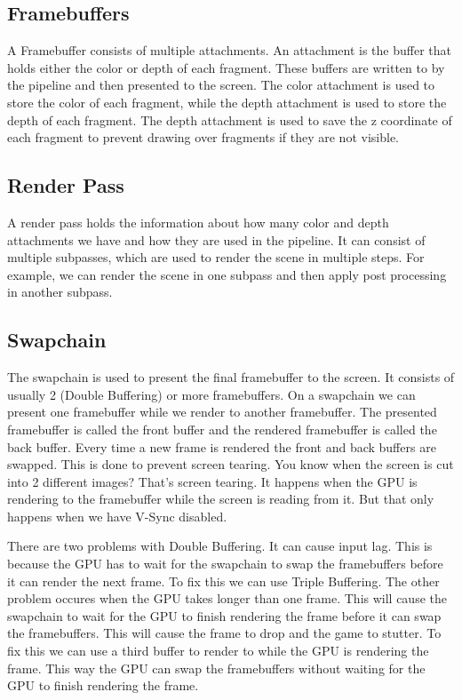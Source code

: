 \documentclass[12pt]{report} \usepackage{preamble}
\begin{document}
\subsection{Framebuffers}

A Framebuffer consists of multiple attachments. An attachment is the buffer
that holds either the color or depth of each fragment.
These buffers are written to by the pipeline and then presented to the screen.
The color attachment is used to store the color of each fragment,
while the depth attachment is used to store the depth of each fragment.
The depth attachment is used to save the z coordinate of each fragment to prevent
drawing over fragments if they are not visible. \cite{framebuffers}

\subsection{Render Pass}

A render pass holds the information about how many color and depth attachments
we have and how they are used in the pipeline.
It can consist of multiple subpasses, which are used to render the scene in multiple steps.
For example, we can render the scene
in one subpass and then apply post processing in another subpass. \cite{render-pass}

\subsection{Swapchain}

The swapchain is used to present the final framebuffer to the screen.
It consists of usually 2 (Double Buffering) or more framebuffers.
On a swapchain we can present one framebuffer while we render to another framebuffer.
The presented framebuffer is called the front buffer and the rendered framebuffer
is called the back buffer. Every time a new frame is rendered the
front and back buffers are swapped. This is done to prevent screen tearing.
You know when the screen is cut into 2 different images? That's screen tearing.
It happens when the GPU is rendering to the framebuffer while the screen is reading from it.
But that only happens when we have V-Sync disabled.

There are two problems with Double Buffering. It can cause input lag.
This is because the GPU has to wait for the swapchain to swap the framebuffers
before it can render the next frame. To fix this we can use Triple Buffering.
The other problem occures when the GPU takes longer than one frame.
This will cause the swapchain to wait for the GPU to finish rendering the frame
before it can swap the framebuffers. This will cause the frame
to drop and the game to stutter. To fix this we can use a third buffer
to render to while the GPU is rendering the frame. This way the GPU can
swap the framebuffers without waiting for the GPU to finish rendering the frame. \cite{swapchain}
\end{document}
